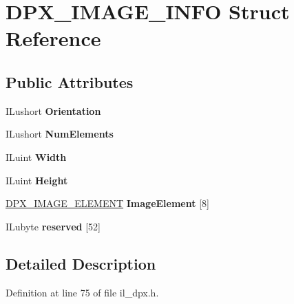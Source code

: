 \hypertarget{structDPX__IMAGE__INFO}{}\section{D\+P\+X\+\_\+\+I\+M\+A\+G\+E\+\_\+\+I\+N\+FO Struct Reference}
\label{structDPX__IMAGE__INFO}
\subsection*{Public Attributes}
\begin{DoxyCompactItemize}
\item 
\mbox{\label{structDPX__IMAGE__INFO_abca3e4f9e41592160f11625663bdab7f}} 
I\+Lushort {\bfseries Orientation}
\item 
\mbox{\label{structDPX__IMAGE__INFO_a74dd40b2423818c2cf6dc6689072bdc9}} 
I\+Lushort {\bfseries Num\+Elements}
\item 
\mbox{\label{structDPX__IMAGE__INFO_a280aa5bdaf14b928810aaa2c3bc95c87}} 
I\+Luint {\bfseries Width}
\item 
\mbox{\label{structDPX__IMAGE__INFO_a5339d0d30260a254b3de422d02f18804}} 
I\+Luint {\bfseries Height}
\item 
\mbox{\label{structDPX__IMAGE__INFO_a57da34396c421a3f6e996a66f9981343}} 
\hyperlink{structDPX__IMAGE__ELEMENT}{D\+P\+X\+\_\+\+I\+M\+A\+G\+E\+\_\+\+E\+L\+E\+M\+E\+NT} {\bfseries Image\+Element} \mbox{[}8\mbox{]}
\item 
\mbox{\label{structDPX__IMAGE__INFO_aae7cc7776cb10862e9fd151d80a69e1e}} 
I\+Lubyte {\bfseries reserved} \mbox{[}52\mbox{]}
\end{DoxyCompactItemize}


\subsection{Detailed Description}


Definition at line 75 of file il\+\_\+dpx.\+h.



